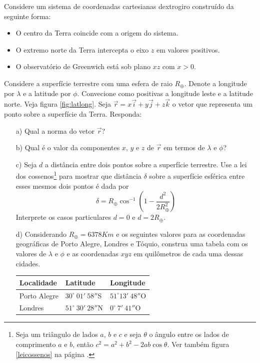 \begin{exer} 
Considere um sistema de coordenadas cartesianas dextrogiro construído da seguinte forma:

\begin{itemize}
\item O centro da Terra coincide com a origem do sistema.
\item O extremo norte da Terra intercepta o eixo $z$ em valores positivos.
\item O observatório de Greenwich está sob plano $xz$ com $x>0$.
\end{itemize}
Considere a superfície terrestre com uma esfera de raio $R_{\oplus}$. Denote a longitude por $\lambda$ e a latitude por $\phi$. Convecione como positivas a longitude leste  e a latitude norte. Veja figura \ref{fig:latlong}. Seja $\vec{r}=x\vec{i}+y\vec{j}+z\vec{k}$ o vetor que representa um ponto sobre a superfície da Terra. Responda:
\begin{itemize}
\item[a)] Qual a norma do vetor $\vec{r}$?
\item[b)] Qual é o valor da componentes $x$, $y$ e $z$ de $\vec{r}$ em termos de $\lambda$ e $\phi$? 
\item[c)] Seja $d$ a distância entre dois pontos sobre a superfície terrestre. Use a lei dos cossenos\footnote{Seja um triângulo de lados $a$, $b$ e $c$ e seja $\theta$ o ângulo entre os lados de comprimento $a$ e $b$, então $c^2=a^2+b^2-2ab\cos\theta.$ Ver também figura \ref{leicossenos} na página \pageref{leicossenos}.} para mostrar que distância $\delta$ sobre a superfície esférica entre esses mesmos dois pontos é dada por
$$\delta=R_\oplus \cos^{-1}\left(1-\frac{d^2}{2R_\oplus^2}\right)$$
Interprete os casos particulares $d=0$ e $d=2R_\oplus$. 
\item[d)] Considerando $R_\oplus=6378Km$ e os seguintes valores para as coordenadas geográficas de Porto Alegre, Londres e Tóquio, construa uma tabela com os valores de $\lambda$ e $\phi$ e as coordenadas $xyz$ em quilômetros de cada uma dessas cidades.
\begin{table}[h]
	\centering
		\begin{tabular}{|l|l|l|}
		\hline
	  Localidade & Latitude & Longitude\\ 
		\hline
		Porto Alegre & $30^\circ~ 01{'}~58{''}$S & $51^\circ  13{'}~48{''}$O\\ 		
  	\hline
		Londres & $51^\circ~ 30{'}~28{''}$N & $0^\circ~ 7{'}~41{''}$O\\ 		

\end{tabular}
\end{table}
\end{itemize}
\end{exer}
